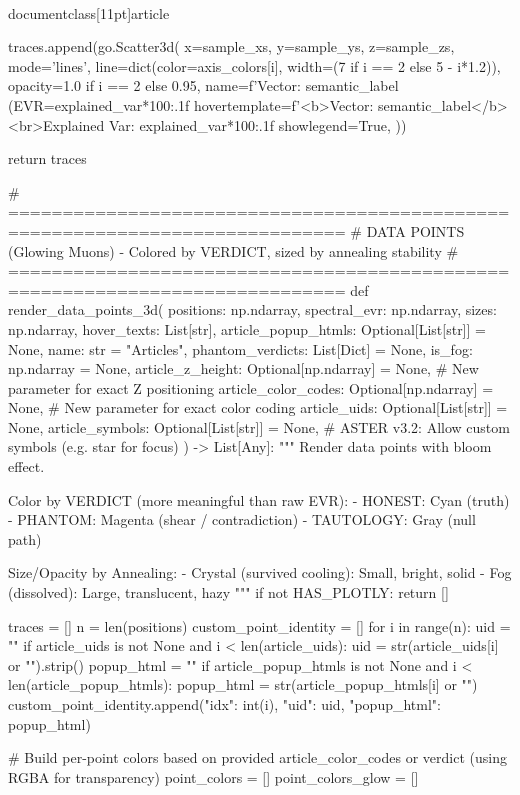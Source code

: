 \\documentclass[11pt]{article}
\begin{document}
\begin{CodeBlock}
{{{        traces.append(go.Scatter3d(
            x=sample_xs,
            y=sample_ys,
            z=sample_zs,
            mode='lines',
            line=dict(color=axis_colors[i], width=(7 if i == 2 else 5 - i*1.2)),
            opacity=1.0 if i == 2 else 0.95,
            name=f'Vector: {semantic_label} (EVR={explained_var*100:.1f}%
            hovertemplate=f'<b>Vector: {semantic_label}</b><br>Explained Var: {explained_var*100:.1f}%
            showlegend=True,
        ))

    return traces


# =============================================================================
# DATA POINTS (Glowing Muons) - Colored by VERDICT, sized by annealing stability
# =============================================================================
def render_data_points_3d(
    positions: np.ndarray,
    spectral_evr: np.ndarray,
    sizes: np.ndarray,
    hover_texts: List[str],
    article_popup_htmls: Optional[List[str]] = None,
    name: str = "Articles",
    phantom_verdicts: List[Dict] = None,
    is_fog: np.ndarray = None,
    article_z_height: Optional[np.ndarray] = None, # New parameter for exact Z positioning
    article_color_codes: Optional[np.ndarray] = None, # New parameter for exact color coding
    article_uids: Optional[List[str]] = None,
    article_symbols: Optional[List[str]] = None, # ASTER v3.2: Allow custom symbols (e.g. star for focus)
) -> List[Any]:
    """
    Render data points with bloom effect.

    Color by VERDICT (more meaningful than raw EVR):
    - HONEST: Cyan (truth)
    - PHANTOM: Magenta (shear / contradiction)
    - TAUTOLOGY: Gray (null path)

    Size/Opacity by Annealing:
    - Crystal (survived cooling): Small, bright, solid
    - Fog (dissolved): Large, translucent, hazy
    """
    if not HAS_PLOTLY:
        return []

    traces = []
    n = len(positions)
    custom_point_identity = []
    for i in range(n):
        uid = ""
        if article_uids is not None and i < len(article_uids):
            uid = str(article_uids[i] or "").strip()
        popup_html = ""
        if article_popup_htmls is not None and i < len(article_popup_htmls):
            popup_html = str(article_popup_htmls[i] or "")
        custom_point_identity.append({"idx": int(i), "uid": uid, "popup_html": popup_html})

    # Build per-point colors based on provided article_color_codes or verdict (using RGBA for transparency)
    point_colors = []
    point_colors_glow = []

}}}
\end{CodeBlock}
\end{document}
